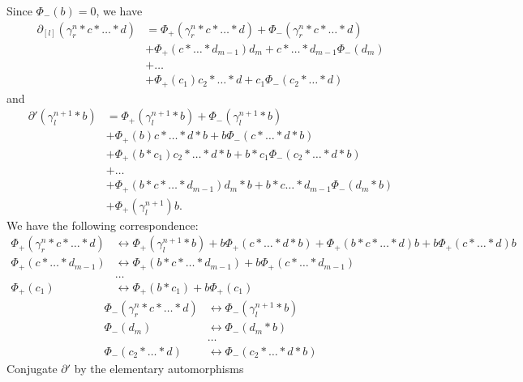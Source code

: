 \documentclass[11pt]{amsart}
\makeatletter
\renewenvironment{proof}[1][\proofname] {\par\pushQED{\qed}{\normalfont\bfseries\topsep6\p@\@plus6\p@\relax #1\@addpunct{.} }}{\popQED\endtrivlist\@endpefalse}
\theoremstyle{mystyle}
\newcommand{\<}{\langle}
\renewcommand{\>}{\rangle}
\makeatother
\begin{document}
\begin{proof}
     Since $\Phi_-(b) = 0$, we have \begin{align*}
        \partial_{[l]}(\gamma_r^n * c * \dots * d) &= \Phi_+(\gamma_r^n * c * \dots * d) + \Phi_-(\gamma_r^n * c * \dots * d) \\
        &+ \Phi_+(c * \dots  * d_{m-1}) d_m + c * \dots  * d_{m-1} \Phi_-(d_m) \\
        &+ \ldots \\
        &+ \Phi_+(c_1)c_2 * \dots  * d + c_1 \Phi_-(c_2 * \dots  * d)
    \end{align*} and \begin{align*}
        \partial'(\gamma_l^{n+1} * b) &= \Phi_+(\gamma_l^{n+1} * b) + \Phi_-(\gamma_l^{n+1} * b) \\
        &+ \Phi_+(b) c * \dots  * d * b + b \Phi_-(c * \dots  * d * b) \\
        &+ \Phi_+(b * c_1) c_2 * \dots  * d * b + b * c_1 \Phi_-(c_2 * \dots  * d * b) \\
        &+ \ldots \\
        &+ \Phi_+(b * c * \dots  * d_{m-1}) d_m * b + b * c \dots  * d_{m-1} \Phi_-(d_m * b) \\
        &+ \Phi_+(\gamma_l^{n+1}) b.
    \end{align*} We have the following correspondence: \begin{align*}
        \Phi_+(\gamma_r^n * c * \dots * d) &\leftrightarrow \Phi_+(\gamma_l^{n+1} * b) + b \Phi_+(c * \dots * d * b) + \Phi_+(b * c * \dots * d)b + b\Phi_+(c * \dots * d)b \\
        \Phi_+(c * \dots * d_{m-1}) &\leftrightarrow \Phi_+(b * c * \dots * d_{m-1}) + b\Phi_+(c * \dots * d_{m-1}) \\
        &\dots \\
        \Phi_+(c_1) &\leftrightarrow \Phi_+(b * c_1) + b \Phi_+(c_1)
    \end{align*} \begin{align*}
        \Phi_-(\gamma_r^n * c * \dots * d) &\leftrightarrow \Phi_-(\gamma_l^{n+1} * b) \\
        \Phi_-(d_m) &\leftrightarrow \Phi_-(d_m * b) \\
        &\dots \\
        \Phi_-(c_2 * \dots * d) &\leftrightarrow \Phi_-(c_2 * \dots * d * b)
    \end{align*} Conjugate $\partial'$ by the elementary automorphisms \begin{align*}

\end{align*}
\end{proof}
\end{document}
